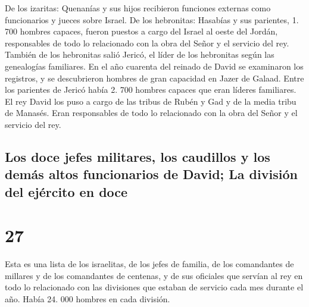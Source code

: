  De los izaritas: Quenanías y sus hijos recibieron
funciones externas como funcionarios y jueces sobre Israel.
 De los hebronitas: Hasabías y sus parientes, 1. 700
hombres capaces, fueron puestos a cargo del Israel al oeste del Jordán,
responsables de todo lo relacionado con la obra del Señor y el servicio
del rey.  También de los hebronitas salió Jericó, el
líder de los hebronitas según las genealogías familiares. En el año
cuarenta del reinado de David se examinaron los registros, y se
descubrieron hombres de gran capacidad en Jazer de Galaad.
 Entre los parientes de Jericó había 2. 700 hombres
capaces que eran líderes familiares. El rey David los puso a cargo de
las tribus de Rubén y Gad y de la media tribu de Manasés. Eran
responsables de todo lo relacionado con la obra del Señor y el servicio
del rey.

\hypertarget{los-doce-jefes-militares-los-caudillos-y-los-demuxe1s-altos-funcionarios-de-david-la-divisiuxf3n-del-ejuxe9rcito-en-doce}{%
\subsection{Los doce jefes militares, los caudillos y los demás altos
funcionarios de David; La división del ejército en
doce}\label{los-doce-jefes-militares-los-caudillos-y-los-demuxe1s-altos-funcionarios-de-david-la-divisiuxf3n-del-ejuxe9rcito-en-doce}}

\hypertarget{section-26}{%
\section{27}\label{section-26}}

 Esta es una lista de los israelitas, de los jefes de
familia, de los comandantes de millares y de los comandantes de
centenas, y de sus oficiales que servían al rey en todo lo relacionado
con las divisiones que estaban de servicio cada mes durante el año.
Había 24. 000 hombres en cada división.

